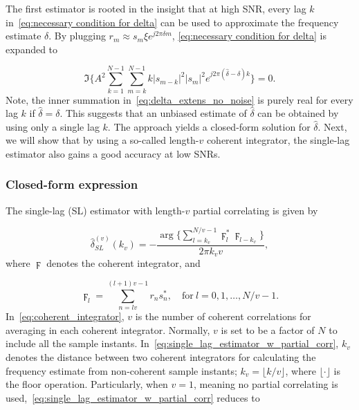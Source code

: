 The first estimator is rooted in the insight that at high SNR, every lag $k$ in~\eqref{eq:necessary condition for delta}
can be used to approximate the frequency estimate $\delta$. By plugging $r_m\approx s_m\xi e^{j2\pi\delta m}$,
\eqref{eq:necessary condition for delta} is expanded to

\begin{equation}
  \label{eq:delta_extens_no_noise}
  \Im\bigg\{A^2\sum_{k=1}^{N-1}\sum_{m=k}^{N-1}k|s_{m-k}|^2|s_m|^2e^{j2\pi (\hat{\delta}-\delta)k}\bigg\}=0.
  \end{equation}
Note, the inner summation in~\eqref{eq:delta_extens_no_noise} is purely real for every lag $k$ if $\hat{\delta}=\delta$.
This suggests that an unbiased estimate of $\hat{\delta}$ can be obtained by using only a single lag $k$. The approach yields
a closed-form solution for $\hat{\delta}$. 
Next, we will show that by using a so-called length-$v$ coherent integrator,
the single-lag estimator also gains a good accuracy at low SNRs.

\subsubsection{Closed-form expression}
The single-lag (SL) estimator with length-$v$ partial correlating is given by

\begin{equation}
  \label{eq:single_lag_estimator_w_partial_corr}
  \hat{\delta}_{SL}^{(v)}(k_v)=-\frac{\arg\big\{\sum_{l=k_v}^{N/v-1}\digamma_l^*\digamma_{l-k_v}\big\}}{2\pi k_vv},
\end{equation}
where $\digamma$ denotes the coherent integrator, and

\begin{equation}
  \label{eq:coherent_integrator}
  \digamma_l=\sum_{n=lv}^{(l+1)v-1}r_ns_n^*, \quad \text{for}~l=0,1,\ldots,N/v{-}1.
\end{equation}
In~\eqref{eq:coherent_integrator}, $v$ is the number of coherent correlations for averaging in each coherent integrator. 
Normally, $v$ is set to be a factor of $N$ to include all the sample instants.
In~\eqref{eq:single_lag_estimator_w_partial_corr}, $k_v$ denotes the distance between
two coherent integrators for calculating the frequency estimate from non-coherent sample instants;
$k_v=\lfloor k/v \rfloor$, where $\lfloor \cdot \rfloor$ is the floor operation. 
Particularly, when $v{=}1$, meaning no partial correlating is used,~\eqref{eq:single_lag_estimator_w_partial_corr} reduces to

